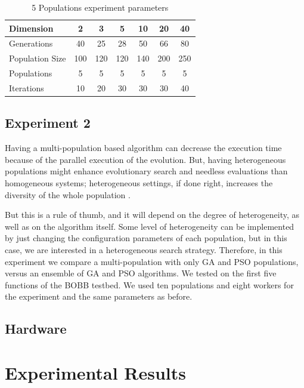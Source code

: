 \documentclass[review]{elsarticle}
\begin{document}
\begin{table}
    \small
    \caption{5 Populations experiment parameters
    }
    \label{tab:params:5}
    \centering
    \small
    \begin{tabular}{|l|c|c|c|c|c|c|}
      \hline
      Dimension        & 2  & 3  & 5  & 10 & 20  & 40  \\ \hline
      Generations      & 40 & 25 & 28 & 50 & 66  & 80  \\ \hline
      Population Size  & 100 & 120 & 120 & 140 & 200 & 250 \\ \hline
      Populations      & 5 & 5 & 5 & 5 & 5  & 5  \\ \hline
      Iterations       & 10 & 20 & 30 & 30 & 30  & 40  \\ \hline  
    \end{tabular}
\end{table}

% 

\subsection{Experiment 2}
\label{sec:exp2}

Having a multi-population based algorithm can decrease the execution time
because of the parallel execution of the evolution. But, having heterogeneous 
populations might enhance evolutionary search and needless
evaluations than homogeneous systems; heterogeneous settings, if
done right, increases the diversity of the whole population
\cite{araujo2008multikulti}.

But this is a rule of thumb, and it will depend on the degree of heterogeneity,
as well as on the algorithm itself. Some level of heterogeneity can be
implemented by just changing the configuration parameters of each population,
but in this case, we are interested in a heterogeneous search strategy. 
Therefore, in this experiment we compare a multi-population with only GA and PSO populations,
versus an ensemble of GA and PSO algorithms. We tested on the first five functions of the
BOBB testbed. We used ten populations and eight workers for the experiment and the
same parameters as before.  

\subsection{Hardware}
\label{sec:hardware}


\section{Experimental Results} 
\label{results}
\end{document}
